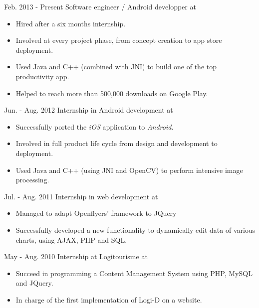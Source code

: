 \cventry
{Feb. 2013 - Present}
{Software engineer / Android developper }
{at }
{}
{}
{
	\begin{itemize}
		\item Hired after a six months internship.
		\item Involved at every project phase, from concept creation to app store deployment.
		\item Used Java and C++ (combined with JNI) to build one of the top productivity app.
		\item Helped to reach more than 500,000 downloads on Google Play.
	\end{itemize}
}

\cventry
{Jun. - Aug. 2012}
{Internship in Android development}
{at }
{}
{}
{
	\begin{itemize}
		\item Successfully ported the \textit{iOS} application to \textit{Android}.
		\item Involved in full product life cycle from design and development to deployment.
		\item Used Java and C++ (using JNI and OpenCV) to perform intensive image processing.
	\end{itemize}
}

\cventry
{Jul. - Aug. 2011}
{Internship in web development}
{at }
{}
{}
{
	\begin{itemize}
		\item Managed to adapt Openflyers' framework to JQuery
		\item Successfully developed a new functionality to dynamically edit data of various charts, using AJAX, PHP and SQL.
	\end{itemize}
}

\cventry
{May - Aug. 2010}
{Internship at Logitourisme}
{at }
{}
{}
{
	\begin{itemize}
		\item Succeed in programming a Content Management System using PHP, MySQL and JQuery.
		\item In charge of the first implementation of Logi-D on a website. 
	\end{itemize}
}